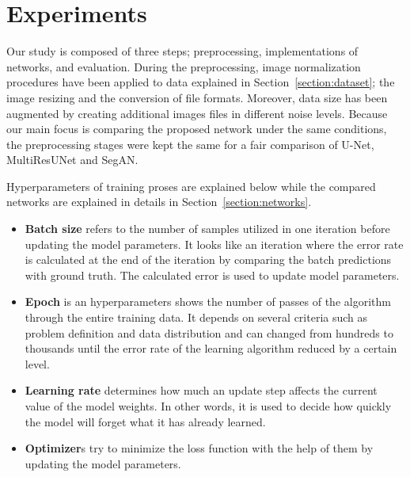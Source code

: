 \section{Experiments}

    Our study is composed of three steps; preprocessing, implementations of networks, and evaluation.
    During the preprocessing, image normalization procedures have been applied to data explained in Section~\ref{section:dataset};
    the image resizing and the conversion of file formats.
    Moreover, data size has been augmented by creating additional images files in different noise levels.
    Because our main focus is comparing the proposed network under the same conditions,
    the preprocessing stages were kept the same for a fair comparison of U-Net, MultiResUNet and SegAN.

    Hyperparameters of training proses are explained below while the compared networks are explained in details in Section~\ref{section:networks}.

    \begin{itemize}

        \item \textbf{Batch size} refers to the number of samples utilized in one iteration before updating the model parameters.
        It looks like an iteration where the error rate is calculated at the end of the iteration by comparing the batch predictions with ground truth.
        The calculated error is used to update model parameters.

        \item \textbf{Epoch} is an hyperparameters shows the number of passes of the algorithm through the entire training data.
        It depends on several criteria such as problem definition and data distribution and can changed from hundreds to thousands
        until the error rate of the learning algorithm reduced by a certain level.

        \item \textbf{Learning rate} determines how much an update step affects the current value of the model weights.
        In other words, it is used to decide how quickly the model will forget what it has already learned.

        \item \textbf{Optimizer}s try to minimize the loss function with the help of them by updating the model parameters.

    \end{itemize}

